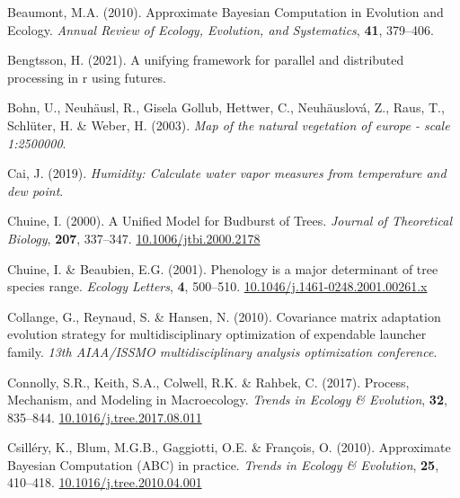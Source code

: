 \documentclass[11pt,]{article}
\newlength{\cslhangindent}
\newenvironment{CSLReferences}[2] %
 {%
  \setlength{\parindent}{0pt}
  \ifodd #1 \everypar{\setlength{\hangindent}{\cslhangindent}}\ignorespaces\fi
  \ifnum #2 > 0
  \setlength{\parskip}{#2\baselineskip}
  \fi
 }%
 {}
\begin{document}
\begin{CSLReferences}{1}{0}
\leavevmode{}%
Beaumont, M.A. (2010). Approximate {Bayesian} {Computation} in
{Evolution} and {Ecology}. \emph{Annual Review of Ecology, Evolution,
and Systematics}, \textbf{41}, 379--406.

\leavevmode{}%
Bengtsson, H. (2021). A unifying framework for parallel and distributed
processing in r using futures.

\leavevmode{}%
Bohn, U., Neuhäusl, R., Gisela Gollub, Hettwer, C., Neuhäuslová, Z.,
Raus, T., Schlüter, H. \& Weber, H. (2003). \emph{Map of the natural
vegetation of europe - scale 1:2500000}.

\leavevmode{}%
Cai, J. (2019). \emph{Humidity: Calculate water vapor measures from
temperature and dew point}.

\leavevmode{}%
Chuine, I. (2000). A {Unified} {Model} for {Budburst} of {Trees}.
\emph{Journal of Theoretical Biology}, \textbf{207}, 337--347.
\href{https://doi.org/10.1006/jtbi.2000.2178}{10.1006/jtbi.2000.2178}

\leavevmode{}%
Chuine, I. \& Beaubien, E.G. (2001). Phenology is a major determinant of
tree species range. \emph{Ecology Letters}, \textbf{4}, 500--510.
\href{https://doi.org/10.1046/j.1461-0248.2001.00261.x}{10.1046/j.1461-0248.2001.00261.x}

\leavevmode{}%
Collange, G., Reynaud, S. \& Hansen, N. (2010). Covariance matrix
adaptation evolution strategy for multidisciplinary optimization of
expendable launcher family. \emph{13th AIAA/ISSMO multidisciplinary
analysis optimization conference}.

\leavevmode{}%
Connolly, S.R., Keith, S.A., Colwell, R.K. \& Rahbek, C. (2017).
Process, {Mechanism}, and {Modeling} in {Macroecology}. \emph{Trends in
Ecology \& Evolution}, \textbf{32}, 835--844.
\href{https://doi.org/10.1016/j.tree.2017.08.011}{10.1016/j.tree.2017.08.011}

\leavevmode{}%
Csilléry, K., Blum, M.G.B., Gaggiotti, O.E. \& François, O. (2010).
Approximate {Bayesian} {Computation} ({ABC}) in practice. \emph{Trends
in Ecology \& Evolution}, \textbf{25}, 410--418.
\href{https://doi.org/10.1016/j.tree.2010.04.001}{10.1016/j.tree.2010.04.001}


\end{CSLReferences}
\end{document}
